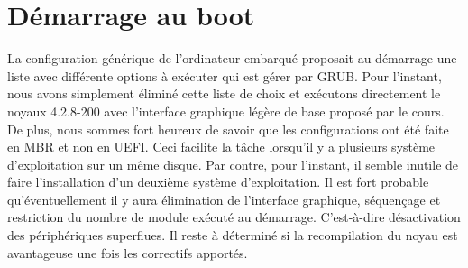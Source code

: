 \section{Démarrage au boot}
La configuration générique de l’ordinateur embarqué proposait au démarrage une liste avec différente options à exécuter qui est gérer par GRUB. Pour l’instant, nous avons simplement éliminé cette liste de choix et exécutons directement le noyaux 4.2.8-200 avec l’interface graphique légère de base proposé par le cours. De plus, nous sommes fort heureux de savoir que les configurations ont été faite en MBR et non en UEFI. Ceci facilite la tâche lorsqu’il y a plusieurs système d’exploitation sur un même disque. Par contre, pour l’instant, il semble inutile de faire l’installation d’un deuxième système d’exploitation. Il est fort probable qu’éventuellement il y aura élimination de l’interface graphique, séquençage et restriction du nombre de module exécuté au démarrage. C’est-à-dire désactivation des périphériques superflues. Il reste à déterminé si la recompilation du noyau est avantageuse une fois les correctifs apportés.  
